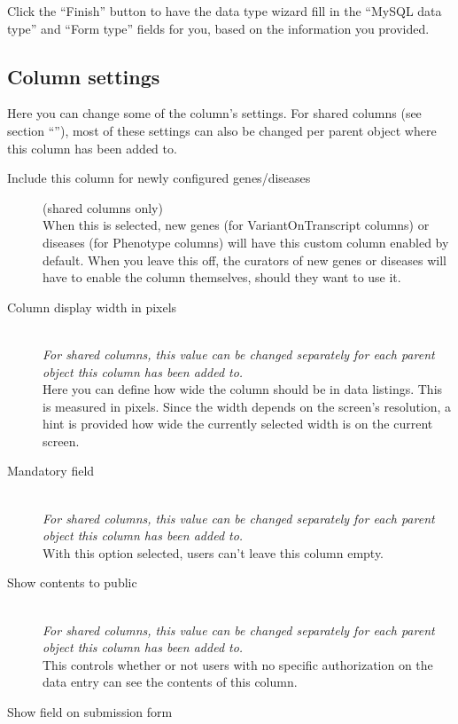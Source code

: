 \noindent
Click the ``Finish'' button to have the data type wizard fill in the ``MySQL data type'' and ``Form type'' fields for you,
 based on the information you provided.



\subsection{Column settings}
Here you can change some of the column's settings.
For shared columns (see section ``''),
 most of these settings can also be changed per parent object where this column has been added to.
\begin{description}
  \item[Include this column for newly configured genes/diseases] (shared columns only)\hfill \\
  When this is selected, new genes (for VariantOnTranscript columns) or diseases (for Phenotype columns) will have this custom column enabled by default.
  When you leave this off, the curators of new genes or diseases will have to enable the column themselves, should they want to use it.
  \item[Column display width in pixels] \hfill \\
  \emph{For shared columns, this value can be changed separately for each parent object this column has been added to.}
  \\
  Here you can define how wide the column should be in data listings.
  This is measured in pixels.
  Since the width depends on the screen's resolution, a hint is provided how wide the currently selected width is on the current screen.
  \item[Mandatory field] \hfill \\
  \emph{For shared columns, this value can be changed separately for each parent object this column has been added to.}
  \\
  With this option selected, users can't leave this column empty.
  \item[Show contents to public] \hfill \\
  \emph{For shared columns, this value can be changed separately for each parent object this column has been added to.}
  \\
  This controls whether or not users with no specific authorization on the data entry can see the contents of this column.
  \item[Show field on submission form] \hfill \\

\end{description}
